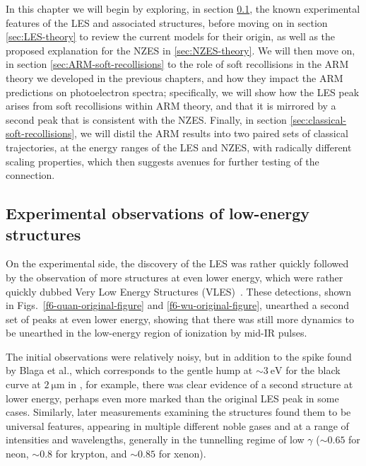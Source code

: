 In this chapter we will begin by exploring, in section \ref{sec:LES-experiment}, the known experimental features of the LES and associated structures, before moving on in section \ref{sec:LES-theory} to review the current models for their origin, as well as the proposed explanation for the NZES in \ref{sec:NZES-theory}. We will then move on, in section \ref{sec:ARM-soft-recollisions} to the role of soft recollisions in the ARM theory we developed in the previous chapters, and how they impact the ARM predictions on photoelectron spectra; specifically, we will show how the LES peak arises from soft recollisions within ARM theory, and that it is mirrored by a second peak that is consistent with the NZES. Finally, in section \ref{sec:classical-soft-recollisions}, we will distil the ARM results into two paired sets of classical trajectories, at the energy ranges of the LES and NZES, with radically different scaling properties, which then suggests avenues for further testing of the connection.



\subsection{Experimental observations of low-energy structures}
\label{sec:LES-experiment}

On the experimental side, the discovery of the LES was rather quickly followed by the observation of more structures at even lower energy, which were rather quickly dubbed Very Low Energy Structures (VLES)~\cite{VLES_initial, VLES_characterization}. These detections, shown in Figs.~\ref{f6-quan-original-figure} and \ref{f6-wu-original-figure}, unearthed a second set of peaks at even lower energy, showing that there was still more dynamics to be unearthed in the low-energy region of ionization by mid-IR pulses. 

The initial observations were relatively noisy, but in addition to the spike found by Blaga et al., which corresponds to the gentle hump at ${\sim}\SI{3}{\electronvolt}$ for the black curve at $\SI{2}{\micro\meter}$ in , for example, there was clear evidence of a second structure at lower energy, perhaps even more marked than the original LES peak in some cases. Similarly, later measurements \cite{VLES_characterization} examining the structures found them to be universal features, appearing in multiple different noble gases and at a range of intensities and wavelengths, generally in the tunnelling regime of low $\gamma$ (${\sim}0.65$ for neon, ${\sim}0.8$ for krypton, and ${\sim}0.85$ for xenon).


